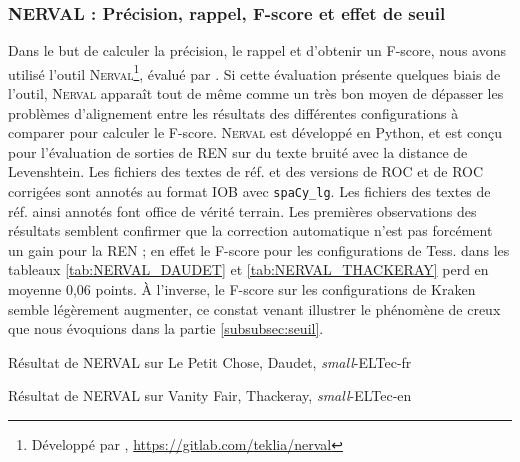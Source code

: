 
\subsubsection{\textsc{NERVAL} : Précision, rappel, F-score et effet de seuil}
\label{subsec:NERVAL_COR-OCR-IMPACT-NER}
Dans le but de calculer la précision, le rappel et d'obtenir un F-score, nous avons utilisé l'outil \textsc{Nerval}\footnote{Développé par , \url{https://gitlab.com/teklia/nerval}}, évalué par . Si cette évaluation présente quelques biais de l'outil, \textsc{Nerval} apparaît tout de même comme un très bon moyen de dépasser les problèmes d'alignement entre les résultats des différentes configurations à comparer pour calculer le F-score. \textsc{Nerval} est développé en Python, et est conçu pour l'évaluation de sorties de REN sur du texte bruité avec la distance de Levenshtein. Les fichiers des textes de réf. et des versions de ROC et de ROC corrigées sont annotés au format IOB avec \texttt{spaCy\_lg}. Les fichiers des textes de réf. ainsi annotés font office de vérité terrain.
Les premières observations des résultats semblent confirmer que la correction automatique n'est pas forcément un gain pour la REN ; en effet le F-score pour les configurations de Tess. dans les tableaux \ref{tab:NERVAL_DAUDET} et \ref{tab:NERVAL_THACKERAY} perd en moyenne 0,06 points. À l'inverse, le F-score sur les configurations de Kraken semble légèrement augmenter, ce constat venant illustrer le phénomène de creux que nous évoquions dans la partie \ref{subsubsec:seuil}.

\begin{table}[h!]
     \centering

     \caption{Résultat de \textsc{NERVAL} sur {\normalfont Le Petit Chose}, Daudet, \textit{small}-ELTec-fr}
     \label{tab:NERVAL_DAUDET}
 \end{table}

   \begin{table}[h!]
     \centering

    \caption{Résultat de \textsc{NERVAL} sur {\normalfont Vanity Fair}, Thackeray, \textit{small}-ELTec-en}
     \label{tab:NERVAL_THACKERAY}
 \end{table}


